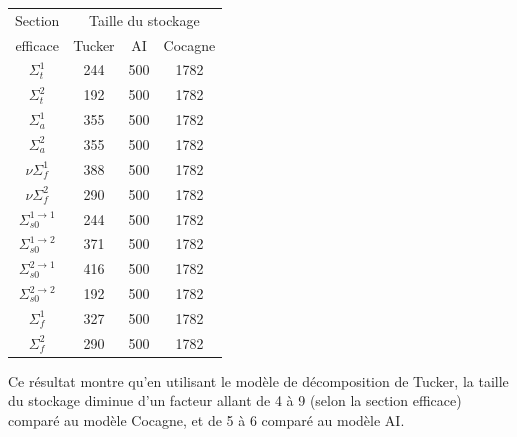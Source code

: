 \begin{center}
\begin{table}[!h]
\begin{tabular}{|*{4}{c|}}
	\hline
	Section              						& \multicolumn{3}{|c|}{Taille du stockage} 		\\
	\cline{2-4}
	efficace				 								& Tucker  			& AI 					 	& Cocagne 		\\
	\hline
	$\Sigma_t^1$ 			 							& 244 						& 500 		 		& 	1782			\\
	\hline
	$\Sigma_t^2$ 			 							& 192 						& 500 		 		& 	1782			\\
	\hline
	$\Sigma_a^1$ 			 							& 355 						& 500 		 		& 	1782			\\
	\hline
	$\Sigma_a^2$ 			 							& 355 						& 500 		 		& 	1782			\\
	\hline
	$\nu \Sigma_f^1$ 			 					& 388 						& 500 		 		& 	1782			\\
	\hline
	$\nu \Sigma_f^2$ 			 					& 290 						& 500 		 		& 	1782			\\
	\hline
	$\Sigma_{s0}^{1\rightarrow1}$ 	& 244 						& 500 		 		& 	1782			\\
	\hline
	$\Sigma_{s0}^{1\rightarrow2}$		& 371 						& 500 		 		& 	1782			\\
	\hline
	$\Sigma_{s0}^{2\rightarrow1}$ 	& 416 						& 500 		 		& 	1782			\\
	\hline
	$\Sigma_{s0}^{2\rightarrow2}$		& 192 						& 500 		 		& 	1782			\\
	\hline
	$\Sigma_f^1$ 			 							& 327 						& 500 		 		& 	1782			\\
	\hline
	$\Sigma_f^2$ 			 							& 290 						& 500 		 		& 	1782			\\
	\hline
\end{tabular}
\label{table:stockage}
\end{table}
\end{center}
 Ce résultat montre qu'en utilisant le modèle de décomposition de Tucker, la taille du stockage diminue d'un facteur allant de 4 à 9 (selon la section efficace) comparé au modèle Cocagne, et de 5 à 6 comparé au modèle AI.



